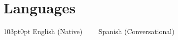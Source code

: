 \section{Languages}
\begin{adjustwidth}{103pt}{0pt}
    English (Native) \ \ \textbullet \ \ Spanish (Conversational)
\end{adjustwidth}
